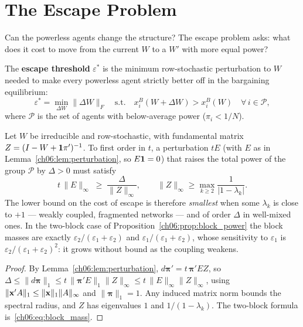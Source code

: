 \documentclass[../structural_economics_book.tex]{subfiles}
\begin{document}
\section{The Escape Problem}
\label{ch07:sec:escape}

Can the powerless agents change the structure? The escape problem asks: what does it cost to move from the current $W$ to a $W'$ with more equal power?

\begin{definition}\label{ch07:def:escape}
The \textbf{escape threshold} $\varepsilon^*$ is the minimum row-stochastic perturbation to $W$ needed to make every powerless agent strictly better off in the bargaining equilibrium:
\begin{equation}
\varepsilon^* = \min_{\Delta W} \|\Delta W\|_F \quad \text{s.t.} \quad x_i^B(W + \Delta W) > x_i^B(W) \quad \forall \, i \in \mathcal{P},
\end{equation}
where $\mathcal{P}$ is the set of agents with below-average power ($\pi_i < 1/N$).
\end{definition}

\begin{proposition}\label{ch07:prop:escape_hard}
Let $W$ be irreducible and row-stochastic, with fundamental matrix $Z = (I - W + \mathbf{1}\pi')^{-1}$. To first order in $t$, a perturbation $tE$ (with $E$ as in Lemma~\ref{ch06:lem:perturbation}, so $E\mathbf{1} = 0$) that raises the total power of the group $\mathcal{P}$ by $\Delta > 0$ must satisfy
\begin{equation}
t\,\|E\|_\infty \;\geq\; \frac{\Delta}{\|Z\|_\infty}, \qquad \|Z\|_\infty \geq \max_{k \geq 2} \frac{1}{|1 - \lambda_k|}.
\end{equation}
The lower bound on the cost of escape is therefore \emph{smallest} when some $\lambda_k$ is close to $+1$ --- weakly coupled, fragmented networks --- and of order $\Delta$ in well-mixed ones. In the two-block case of Proposition~\ref{ch06:prop:block_power} the block masses are exactly $\varepsilon_2/(\varepsilon_1 + \varepsilon_2)$ and $\varepsilon_1/(\varepsilon_1 + \varepsilon_2)$, whose sensitivity to $\varepsilon_1$ is $\varepsilon_2/(\varepsilon_1 + \varepsilon_2)^2$: it grows without bound as the coupling weakens.
\end{proposition}

\begin{proof}
By Lemma~\ref{ch06:lem:perturbation}, $d\boldsymbol{\pi}' = t\,\boldsymbol{\pi}'EZ$, so $\Delta \leq \|d\boldsymbol{\pi}\|_1 \leq t\,\|\boldsymbol{\pi}'E\|_1\|Z\|_\infty \leq t\,\|E\|_\infty\|Z\|_\infty$, using $\|\mathbf{x}'A\|_1 \leq \|\mathbf{x}\|_1\|A\|_\infty$ and $\|\boldsymbol{\pi}\|_1 = 1$. Any induced matrix norm bounds the spectral radius, and $Z$ has eigenvalues $1$ and $1/(1 - \lambda_k)$. The two-block formula is~\eqref{ch06:eq:block_mass}.
\end{proof}
\end{document}
